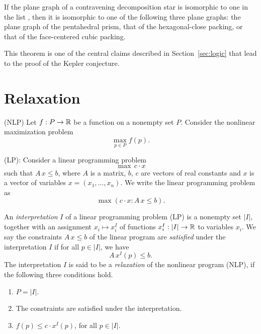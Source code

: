 \begin{theorem}\label{lemma:fcc-hcp-pent}
If the plane graph of a contravening decomposition star is
isomorphic to one in the list \cite{web}, then it is isomorphic to
one of the following three plane graphs: the plane graph of the
pentahedral prism, that of the hexagonal-close packing, or that of
the face-centered cubic packing.
\end{theorem}

This theorem is one of the central claims described in
Section~\ref{sec:logic} that lead to the proof of the Kepler
conjecture.


\section{Relaxation}

(NLP) Let $f:P\to{\mathbb R}$ be a function on a nonempty set $P$. Consider the
nonlinear maximization problem
    $$\max_{p\in P} f(p).$$

(LP): Consider a linear programming problem
    $$\max\, c\cdot x$$ such that $A\, x\le b$, where $A$ is a matrix,
    $b$, $c$ are vectors of real constants and $x$ is a vector of
    variables $x = (x_1,\ldots,x_n)$.  We write the linear
    programming problem as
    $$\max(c\cdot x : A\,x\le b).$$

An {\it interpretation\/} $I$ of a linear programming problem (LP)
is a nonempty set $|I|$, together with an assignment $x_i\mapsto
x_i^I$ of functions $x^I_i:|I|\to{\mathbb R}$ to variables $x_i$.  We say
the constraints $A\,x\le b$ of the linear program are {\it
satisfied\/} under the interpretation $I$ if for all $p\in |I|$,
we have $$A\, x^I(p) \le b.$$ The interpretation $I$ is said to be
a {\it relaxation\/} of the nonlinear program (NLP), if the
following three conditions hold.
%
    \begin{enumerate}
    \item  $P=|I|$.
    \item The constraints are satisfied under the interpretation.
    \item $f(p)\le c\cdot x^I(p)$, for all $p\in|I|$.
    \end{enumerate}

